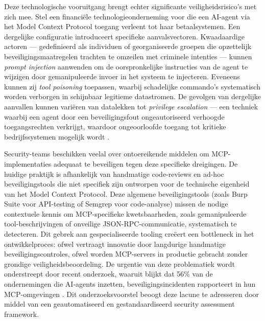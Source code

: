 Deze technologische vooruitgang brengt echter significante veiligheidsrisico's met zich mee. Stel een financiële technologieonderneming voor die een AI-agent via het Model Context Protocol toegang verleent tot haar betaalsystemen. Een dergelijke configuratie introduceert specifieke aanvalsvectoren. Kwaadaardige actoren — gedefinieerd als individuen of georganiseerde groepen die opzettelijk beveiligingsmaatregelen trachten te omzeilen met criminele intenties — kunnen \emph{prompt injection} aanwenden om de oorspronkelijke instructies van de agent te wijzigen door gemanipuleerde invoer in het systeem te injecteren. Eveneens kunnen zij \emph{tool poisoning} toepassen, waarbij schadelijke commando's systematisch worden verborgen in schijnbaar legitieme datastromen. De gevolgen van dergelijke aanvallen kunnen variëren van datalekken tot \emph{privilege escalation} — een techniek waarbij een agent door een beveiligingsfout ongeautoriseerd verhoogde toegangsrechten verkrijgt, waardoor ongeoorloofde toegang tot kritieke bedrijfssystemen mogelijk wordt \autocite{song2025protocolunveilingattackvectors}.

Security-teams beschikken veelal over ontoereikende middelen om MCP-implementaties adequaat te beveiligen tegen deze specifieke dreigingen. De huidige praktijk is afhankelijk van handmatige code-reviews en ad-hoc beveiligingstools die niet specifiek zijn ontworpen voor de technische eigenheid van het Model Context Protocol. Deze algemene beveiligingstools (zoals Burp Suite voor API-testing of Semgrep voor code-analyse) missen de nodige contextuele kennis om MCP-specifieke kwetsbaarheden, zoals gemanipuleerde tool-\hspace{0pt}beschrijvingen of onveilige JSON-RPC-communicatie, systematisch te detecteren. Dit gebrek aan gespecialiseerde tooling creëert een bottleneck in het ontwikkelproces: ofwel vertraagt innovatie door langdurige handmatige beveiligingscontroles, ofwel worden MCP-servers in productie gebracht zonder grondige veiligheidsbeoordeling. De urgentie van deze problematiek wordt onderstreept door recent onderzoek, waaruit blijkt dat 56\% van de ondernemingen die AI-agents inzetten, beveiligingsincidenten rapporteert in hun MCP-omgevingen \autocite{guo2025systematicanalysismcpsecurity}. Dit onderzoeksvoorstel beoogt deze lacune te adresseren door middel van een geautomatiseerd en gestandaardiseerd security assessment framework.




